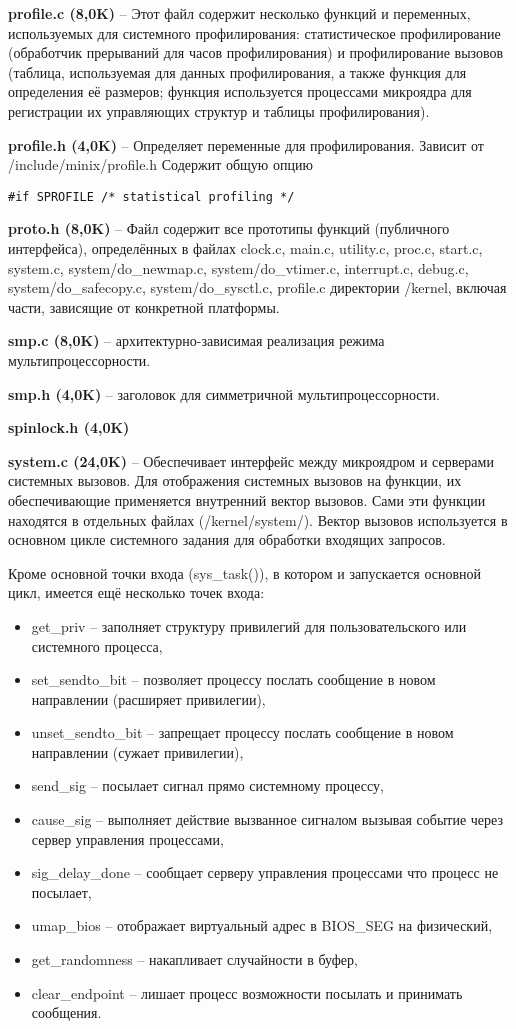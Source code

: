 \textbf{profile.c (8,0K)} -- Этот файл содержит несколько функций и переменных, используемых для системного профилирования: статистическое профилирование (обработчик прерываний для часов профилирования) и профилирование вызовов (таблица, используемая для данных профилирования, а также
функция для определения её размеров; функция используется процессами микроядра для регистрации их управляющих структур и таблицы профилирования).

\textbf{profile.h (4,0K)} -- Определяет переменные для профилирования. Зависит от /include/minix/profile.h
Содержит общую опцию
\begin{Verbatim}[frame=single]
#if SPROFILE /* statistical profiling */
\end{Verbatim}

\textbf{proto.h (8,0K)} -- Файл содержит все прототипы функций (публичного интерфейса), определённых в файлах clock.c, main.c, utility.c, proc.c, start.c, system.c, system/do\_newmap.c, system/do\_vtimer.c, interrupt.c, debug.c, system/do\_safecopy.c, system/do\_sysctl.c, profile.c директории /kernel, включая части, зависящие от конкретной платформы.

\textbf{smp.c (8,0K)} -- архитектурно-зависимая реализация режима мультипроцессорности.

\textbf{smp.h (4,0K)} -- заголовок для симметричной мультипроцессорности.

\textbf{spinlock.h (4,0K)}

\textbf{system.c (24,0K)} -- Обеспечивает интерфейс между микроядром и серверами системных вызовов. Для отображения системных вызовов на функции, их обеспечивающие применяется внутренний вектор вызовов. Сами эти функции находятся в отдельных файлах (/kernel/system/). Вектор вызовов используется в основном цикле системного задания для обработки входящих запросов.

Кроме основной точки входа (sys\_task()), в котором и запускается основной цикл, имеется ещё несколько точек входа:
\begin{itemize}
\item get\_priv -- заполняет структуру привилегий для пользовательского или системного процесса,
\item set\_sendto\_bit -- позволяет процессу послать сообщение в новом направлении (расширяет привилегии),
\item unset\_sendto\_bit -- запрещает процессу послать сообщение в новом направлении (сужает привилегии),
\item send\_sig -- посылает сигнал прямо системному процессу,
\item cause\_sig -- выполняет действие вызванное сигналом вызывая событие через сервер управления процессами,
\item sig\_delay\_done -- сообщает серверу управления процессами что процесс не посылает,
\item umap\_bios -- отображает виртуальный адрес в BIOS\_SEG на физический,
\item get\_randomness -- накапливает случайности в буфер,
\item clear\_endpoint -- лишает процесс возможности посылать и принимать сообщения.
\end{itemize}

